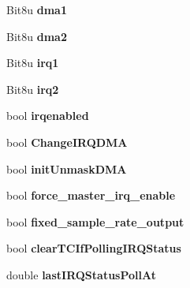 \begin{DoxyCompactItemize}
\item 
\hypertarget{structGFGus_a8f85bbf75654bc07c18c99ace603abfa}{Bit8u {\bfseries dma1}}\label{structGFGus_a8f85bbf75654bc07c18c99ace603abfa}

\item 
\hypertarget{structGFGus_a2c5b80f3d718d473666275ca05426004}{Bit8u {\bfseries dma2}}\label{structGFGus_a2c5b80f3d718d473666275ca05426004}

\item 
\hypertarget{structGFGus_a77dbee069455b135eb03cb0506ca7183}{Bit8u {\bfseries irq1}}\label{structGFGus_a77dbee069455b135eb03cb0506ca7183}

\item 
\hypertarget{structGFGus_aee8e865cfc001eee4b684a9f0aaf13c2}{Bit8u {\bfseries irq2}}\label{structGFGus_aee8e865cfc001eee4b684a9f0aaf13c2}

\item 
\hypertarget{structGFGus_a880603316b40656dcd6a0a66b31de0e1}{bool {\bfseries irqenabled}}\label{structGFGus_a880603316b40656dcd6a0a66b31de0e1}

\item 
\hypertarget{structGFGus_a886bb283bcdd3fed729cc9d0a227e215}{bool {\bfseries Change\-I\-R\-Q\-D\-M\-A}}\label{structGFGus_a886bb283bcdd3fed729cc9d0a227e215}

\item 
\hypertarget{structGFGus_addf5f696942ccec4aaee7c90fad1666f}{bool {\bfseries init\-Unmask\-D\-M\-A}}\label{structGFGus_addf5f696942ccec4aaee7c90fad1666f}

\item 
\hypertarget{structGFGus_a6f0abbfeda3210c8815df893b4050932}{bool {\bfseries force\-\_\-master\-\_\-irq\-\_\-enable}}\label{structGFGus_a6f0abbfeda3210c8815df893b4050932}

\item 
\hypertarget{structGFGus_ad2d7df4869b08f0d511c27c825f875c3}{bool {\bfseries fixed\-\_\-sample\-\_\-rate\-\_\-output}}\label{structGFGus_ad2d7df4869b08f0d511c27c825f875c3}

\item 
\hypertarget{structGFGus_a7f5277e4f45d370accfe2d3bead2bc4e}{bool {\bfseries clear\-T\-C\-If\-Polling\-I\-R\-Q\-Status}}\label{structGFGus_a7f5277e4f45d370accfe2d3bead2bc4e}

\item 
\hypertarget{structGFGus_af0b298312f809cdbee6142fde65bbe1c}{double {\bfseries last\-I\-R\-Q\-Status\-Poll\-At}}\label{structGFGus_af0b298312f809cdbee6142fde65bbe1c}


\end{DoxyCompactItemize}
